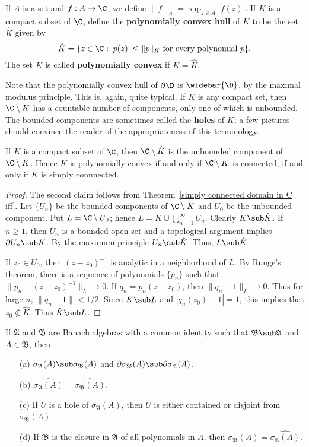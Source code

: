 \begin{definition}
If $A$ is a set and $f:A\to\C$, we define $\|f\|_A=\sup_{z\in A}|f(z)|$. If $K$ is a compact subset of $\C$, define the \textbf{polynomially convex hull} of $K$ to be the set $\hat{K}$ given by
\[\hat{K}=\{z\in\C:|p(z)|\leq\|p\|_K\text{ for every polynomial $p$}\}.\]
The set $K$ is called \textbf{polynomially convex} if $K=\hat{K}$.
\end{definition}
Note that the polynomially convex hull of $\partial\D$ is $\widebar{\D}$, by the maximal modulus principle. This is, again, quite typical. If $K$ is any compact set, then $\C\setminus K$ has a countable number of components, only one of which is unbounded. The bounded components are sometimes called the \textbf{holes} of $K$; a few pictures should convince the reader of the appropriateness of this terminology.
\begin{proposition}
If $K$ is a compact subset of $\C$, then $\C\setminus\hat{K}$ is the unbounded component of $\C\setminus K$. Hence $K$ is polynomially convex if and only if $\C\setminus K$ is connected, if and only if $K$ is simply connnected.
\end{proposition}
\begin{proof}
The second claim follows from Theorem~\ref{simply connected domain in C iff}. Let $\{U_n\}$ be the bounded components of $\C\setminus K$ and $U_0$ be the unbounded component. Put $L=\C\setminus U_0$; hence $L=K\cup\bigcup_{n=1}^{\infty}U_n$. Clearly $K\sub\hat{K}$. If $n\geq 1$, then $U_n$ is a bounded open set and a topological argument implies $\partial U_n\sub K$. By the maximum principle $U_n\sub\hat{K}$. Thus, $L\sub\hat{K}$.\par
If $z_0\in U_0$, then $(z-z_0)^{-1}$ is analytic in a neighborhood of $L$. By Runge's theorem, there is a sequence of polynomials $\{p_n\}$ such that $\|p_n-(z-z_0)^{-1}\|_L\to 0$. If $q_n=p_n(z-z_0)$, then $\|q_n-1\|_L\to 0$. Thus for large $n$, $\|q_n-1\|<1/2$. Since $K\sub L$ and $|q_n(z_0)-1|=1$, this implies that $z_0\notin\hat{K}$. Thus $\hat{K}\sub L$.
\end{proof}
\begin{theorem}\label{Banach algebra spectrum dependence on algebra}
If $\mathfrak{A}$ and $\mathfrak{B}$ are Banach algebras with a common identity such that $\mathfrak{B}\sub\mathfrak{A}$ and $A\in\mathfrak{B}$, then
\begin{itemize}
\item[(a)] $\sigma_{\mathfrak{A}}(A)\sub\sigma_{\mathfrak{B}}(A)$ and $\partial\sigma_{\mathfrak{B}}(A)\sub\partial\sigma_{\mathfrak{A}}(A)$.
\item[(b)] $\widehat{\sigma_{\mathfrak{A}}(A)}=\widehat{\sigma_{\mathfrak{B}}(A)}$.
\item[(c)] If $U$ is a hole of $\sigma_{\mathfrak{A}}(A)$, then $U$ is either contained or disjoint from $\sigma_{\mathfrak{B}}(A)$.
\item[(d)] If $\mathfrak{B}$ is the closure in $\mathfrak{A}$ of all polynomials in $A$, then $\sigma_{\mathfrak{B}}(A)=\widehat{\sigma_{\mathfrak{A}}(A)}$. 
\end{itemize}
\end{theorem}
